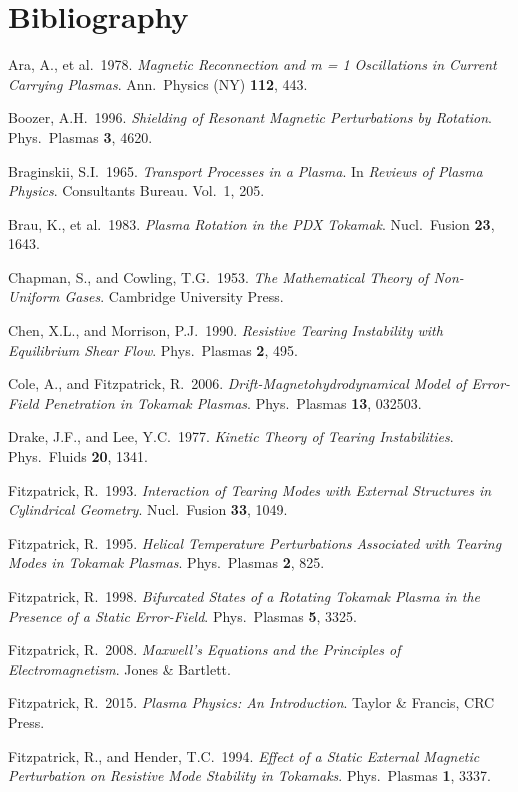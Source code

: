 \documentclass[notitlepage,12pt]{article}
\begin{document}
\section*{Bibliography}
\begin{description}
\item Ara, A., et al.\ 1978. {\em Magnetic Reconnection and m = 1 Oscillations in Current Carrying Plasmas}. Ann.\ Physics (NY) 
{\bf 112}, 443. 
\item Boozer, A.H.\ 1996. {\em Shielding of Resonant Magnetic Perturbations by Rotation}. Phys.\ Plasmas {\bf 3}, 4620.
\item Braginskii, S.I.\ 1965. {\em Transport Processes in a Plasma}. In {\em Reviews of Plasma Physics}. Consultants Bureau. Vol.~1, 205.
\item Brau, K., et al.\ 1983. {\em Plasma Rotation in the PDX Tokamak}. Nucl.\ Fusion {\bf 23}, 1643.
\item Chapman, S., and Cowling, T.G.\ 1953. {\em The Mathematical Theory of Non-Uniform Gases}. Cambridge University Press.
\item Chen, X.L., and Morrison, P.J.\ 1990. {\em Resistive Tearing Instability with Equilibrium Shear Flow}. Phys.\ Plasmas {\bf 2}, 495. 
\item Cole, A., and Fitzpatrick, R.\ 2006. {\em Drift-Magnetohydrodynamical Model of Error-Field Penetration in Tokamak
Plasmas}. Phys.\ Plasmas {\bf 13}, 032503. 
\item Drake, J.F., and Lee, Y.C.\ 1977. {\em Kinetic Theory of Tearing Instabilities}. Phys.\ Fluids {\bf 20}, 1341.
\item Fitzpatrick, R.\ 1993. {\em Interaction of Tearing Modes with External Structures in Cylindrical Geometry}. Nucl.\ Fusion {\bf 33}, 1049. 
\item Fitzpatrick, R.\ 1995. {\em Helical Temperature Perturbations Associated with Tearing Modes in Tokamak Plasmas}. Phys.\ Plasmas {\bf 2}, 825. 
\item Fitzpatrick, R.\ 1998. {\em Bifurcated States of a Rotating Tokamak Plasma in the Presence of a Static Error-Field}. Phys.\ Plasmas {\bf 5}, 3325. 
\item Fitzpatrick, R.\ 2008. {\em Maxwell's Equations and the Principles of Electromagnetism}. Jones \& Bartlett.
\item Fitzpatrick, R.\ 2015. {\em Plasma Physics: An Introduction}. Taylor \& Francis, CRC Press. 
\item Fitzpatrick, R., and Hender, T.C.\ 1994. {\em Effect of a Static External Magnetic Perturbation on Resistive Mode Stability in Tokamaks}. Phys.\ Plasmas {\bf 1}, 3337. 

\end{description}
\end{document}
